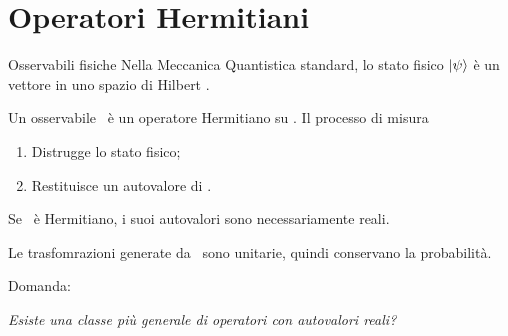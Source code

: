 \section{Operatori Hermitiani}
\begin{frame}{Osservabili fisiche}
    Nella Meccanica Quantistica standard, lo stato fisico $\ket{\psi}$ è un vettore in uno spazio di Hilbert \mcH.

    \pause
    Un osservabile \hA\ è un operatore Hermitiano su \mcH. Il processo di misura 
    \begin{enumerate}[label=\mybullet]
        \pause
        \item Distrugge lo stato fisico;
        \pause
        \item Restituisce un autovalore di \hA.
    \end{enumerate}

    Se \hA\ è Hermitiano, i suoi autovalori sono necessariamente reali.

    \pause
    Le trasfomrazioni generate da \hA\ sono unitarie, quindi conservano la probabilità.
\end{frame}

\begin{frame}
    Domanda:
    \pause
    \begin{center}
        {\it Esiste una classe più generale di operatori con autovalori reali?}
    \end{center}
\end{frame}

